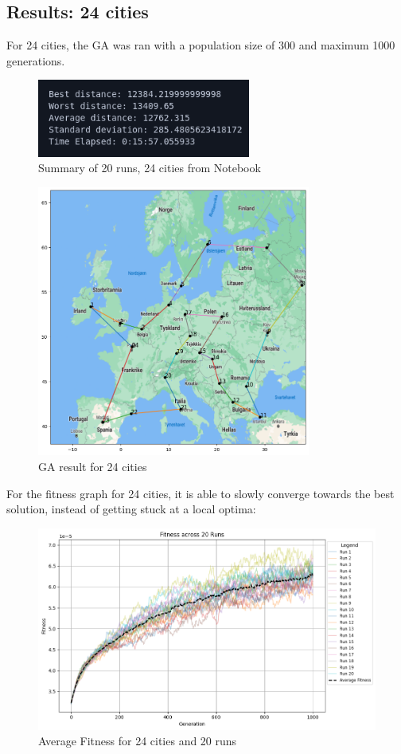 \documentclass{article}
\begin{document}
    \newpage


    \subsection{Results: 24 cities}

    For 24 cities, the GA was ran with a population size of 300 and maximum 1000 generations.

    \begin{figure}[ht!]
        \includegraphics[width=7cm]{images/ga_24_cities_summary.png}
        \centering
        \caption{Summary of 20 runs, 24 cities from Notebook}
    \end{figure}

    \begin{figure}[ht!]
        \includegraphics[width=9cm]{images/ga_24_cities.png}
        \centering
        \caption{GA result for 24 cities}
    \end{figure}

    For the fitness graph for 24 cities, it is able to slowly converge towards the best solution, instead of getting stuck at a local optima:

    \begin{figure}[ht!]
        \includegraphics[width=12cm]{images/ga_24_cities_avg_graph.png}
        \centering
        \caption{Average Fitness for 24 cities and 20 runs}
    \end{figure}
\end{document}
